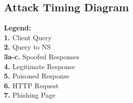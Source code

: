 \documentclass[12pt,a4paper]{article}
\begin{document}
\subsection{Attack Timing Diagram}

\begin{minipage}[t]{0.3\textwidth}
\textbf{Legend:}\\
\textbf{1.} Client Query\\
\textbf{2.} Query to NS\\
\textbf{3a-c.} Spoofed Responses\\
\textbf{4.} Legitimate Response\\
\textbf{5.} Poisoned Response\\
\textbf{6.} HTTP Request\\
\textbf{7.} Phishing Page
\end{minipage}
\end{document}
